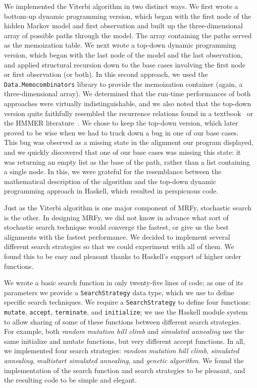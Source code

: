 \documentclass[preprint]{sigplanconf}
\begin{document}
We implemented the Viterbi algorithm in two distinct ways. We first wrote a 
bottom-up dynamic programming version, which began with the first node of the 
hidden Markov model and first observation and built up the three-dimensional 
array of possible paths through the model. The array containing the paths 
served as the memoization table. We next wrote a top-down dynamic programming 
version, which began with the last node of the model and the last observation, 
and applied structural recursion down to the base cases involving the first 
node or first observation (or both). In this second approach, we used the 
\texttt{Data.Memocombinators} library to provide the memoization container (again, a 
three-dimensional array). We determined that the run-time performances of both 
approaches were virtually indistinguishable, and we also noted that the 
top-down version quite faithfully resembled the recurrence relations found in a 
textbook~\cite{durbin} or the HMMER literature~\cite{eddy}. We chose to keep 
the top-down version, which later proved to be wise when we had to track down a 
bug in one of our base cases. This bug was observed as a missing state in the 
alignment our program displayed, and we quickly discovered that one of our base 
cases was missing this state: it was returning an empty list as the base of the 
path, rather than a list containing a single node. In this, we were grateful 
for the resemblance between the mathematical description of the algorithm and 
the top-down dynamic programming approach in Haskell, which resulted in 
perspicuous code.

Just as the Viterbi algorithm is one major component of MRFy, stochastic search 
is the other. In designing MRFy, we did not know in advance what sort of 
stochastic search technique would converge the fastest, or give us the best 
alignments with the fastest performance. We decided to implement several 
different search strategies so that we could experiment with all of them. We 
found this to be easy and pleasant thanks to Haskell's support of higher order 
functions.

We wrote a basic search function in only twenty-five lines of code; as one of 
its parameters we provide a \texttt{SearchStrategy} data type, which we use to 
define specific search techniques. We require a \texttt{SearchStrategy} to 
define four functions: \texttt{mutate}, \texttt{accept}, \texttt{terminate}, 
and \texttt{initialize}; we use the Haskell module system to allow sharing of 
some of these functions between different search strategies. For example, both 
\textit{random mutation hill climb} and \textit{simulated annealing} use the 
same initialize and mutate functions, but very different accept functions. In 
all, we implemented four search strategies: \textit{random mutation hill 
climb}, \textit{simulated annealing}, \textit{multistart simulated annealing}, 
and \textit{genetic algorithm}. We found the implementation of the search 
function and search strategies to be pleasant, and the resulting code to be 
simple and elegant.
\end{document}
